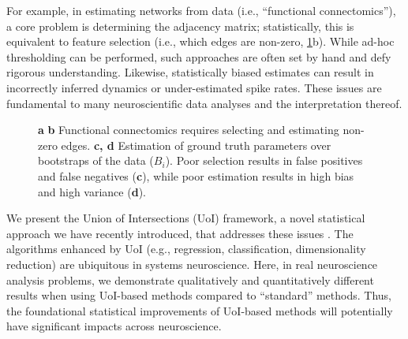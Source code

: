 \documentclass[letterpaper, 10 pt, conference]{ieeeconf}  %
\begin{document}
For example, in estimating networks from data (i.e., ``functional connectomics''), a core problem is determining the adjacency matrix; statistically, this is equivalent to feature selection (i.e., which edges are non-zero, \ref{fig:intro}b). While ad-hoc thresholding can be performed, such approaches are often set by hand and defy rigorous understanding. Likewise, statistically biased estimates can result in incorrectly inferred dynamics or under-estimated spike rates. These issues are fundamental to many neuroscientific data analyses and the interpretation thereof.

\begin{figure}[b!]
    \vspace{-20pt}
    \centering
    \caption{\textbf{a} \textbf{b} Functional connectomics requires selecting and estimating non-zero edges. \textbf{c, d} Estimation of ground truth parameters over bootstraps of the data ($B_i$). Poor selection results in false positives and false negatives (\textbf{c}), while poor estimation results in high bias and high variance (\textbf{d}).}
    \label{fig:intro}
\end{figure}

We present the Union of Intersections (UoI) framework, a novel statistical approach we have recently introduced, that addresses these issues \cite{uoi}. The algorithms enhanced by UoI (e.g., regression, classification, dimensionality reduction) are ubiquitous in systems neuroscience. Here, in real neuroscience analysis problems, we demonstrate qualitatively and quantitatively different results when using UoI-based methods compared to ``standard'' methods.  Thus, the foundational statistical improvements of UoI-based methods will potentially have significant impacts across neuroscience.
\end{document}
